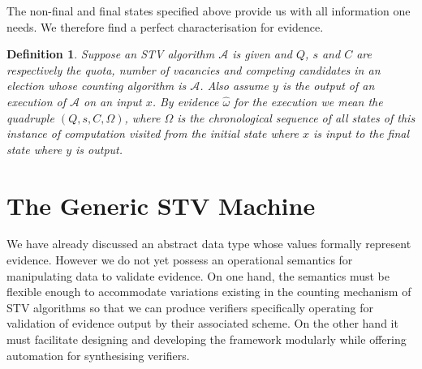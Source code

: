 \documentclass[10pt,conference]{IEEEtran}
\newtheorem{definition}{Definition}
\begin{document}
The non-final and final states specified above provide us with all information one needs. We therefore find a perfect characterisation for evidence. 
\begin{definition}\label{formalEv}
Suppose an STV algorithm $\mathcal{A}$ is given and $Q$, $s$ and $C$
are respectively the quota, number of vacancies and competing
candidates in an election whose counting algorithm is $\mathcal{A}$. Also assume  $y$ is the output of an execution of $\mathcal{A}$ on an input $x$. By evidence $\hat{\omega}$ for the execution  we mean the quadruple $(Q,s,C,\Omega)$, where $\Omega$ is the chronological sequence of all states of this instance of computation visited from the initial state where $x$ is input to the final state where $y$ is output.   
\end{definition}
\section{The Generic STV  Machine}
\label{sec:Machine}
\setlength{\abovedisplayskip}{0.5em}
\setlength{\belowdisplayskip}{0.5em}
We have already discussed an abstract data type whose values
formally represent evidence. However we do not yet possess an
operational semantics for manipulating data to validate evidence.
On one hand, the semantics must be flexible enough to accommodate
variations existing in the counting mechanism of STV algorithms so
that we can produce verifiers  specifically operating for validation
of evidence output by their associated scheme. On the other hand it
must facilitate designing and developing the framework modularly
while offering automation for synthesising verifiers.
\end{document}
